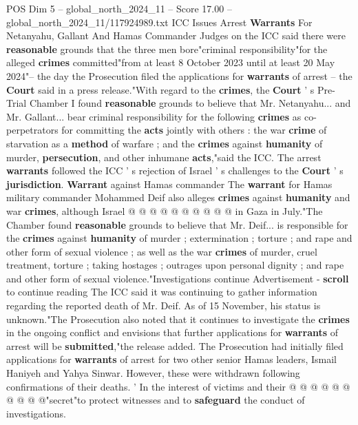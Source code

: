 \begin{textsample}{POS Dim 5 – global\_north\_2024\_11 – Score 17.00 – global\_north\_2024\_11/117924989.txt}  \label{ex:f5_pos_040}
ICC Issues Arrest \textbf{Warrants} For Netanyahu, Gallant And Hamas Commander Judges on the ICC said there were \textbf{reasonable} grounds that the three men bore"criminal responsibility"for the alleged \textbf{crimes} committed"from at least 8 October 2023 until at least 20 May 2024"-- the day the Prosecution filed the applications for \textbf{warrants} of arrest -- the \textbf{Court} said in a press release."With regard to the \textbf{crimes}, the \textbf{Court} ' s Pre-Trial Chamber I found \textbf{reasonable} grounds to believe that Mr.
Netanyahu... and Mr.
Gallant... bear criminal responsibility for the following \textbf{crimes} as co-perpetrators for committing the \textbf{acts} jointly with others : the war \textbf{crime} of starvation as a \textbf{method} of warfare ; and the \textbf{crimes} against \textbf{humanity} of murder, \textbf{persecution}, and other inhumane \textbf{acts},"said the ICC.
The arrest \textbf{warrants} followed the ICC ' s rejection of Israel ' s challenges to the \textbf{Court} ' s \textbf{jurisdiction}. \textbf{Warrant} against Hamas commander The \textbf{warrant} for Hamas military commander Mohammed Deif also alleges \textbf{crimes} against \textbf{humanity} and war \textbf{crimes}, although Israel @ @ @ @ @ @ @ @ @ @ in Gaza in July."The Chamber found \textbf{reasonable} grounds to believe that Mr.
Deif... is responsible for the \textbf{crimes} against \textbf{humanity} of murder ; extermination ; torture ; and rape and other form of sexual violence ; as well as the war \textbf{crimes} of murder, cruel treatment, torture ; taking hostages ; outrages upon personal dignity ; and rape and other form of sexual violence."Investigations continue Advertisement - \textbf{scroll} to continue reading The ICC said it was continuing to gather information regarding the reported death of Mr.
Deif.
As of 15 November, his status is unknown."The Prosecution also noted that it continues to investigate the \textbf{crimes} in the ongoing conflict and envisions that further applications for \textbf{warrants} of arrest will be \textbf{submitted},"the release added.
The Prosecution had initially filed applications for \textbf{warrants} of arrest for two other senior Hamas leaders, Ismail Haniyeh and Yahya Sinwar.
However, these were withdrawn following confirmations of their deaths. ' In the interest of victims and their @ @ @ @ @ @ @ @ @ @"secret"to protect witnesses and to \textbf{safeguard} the conduct of investigations.

\end{textsample}
